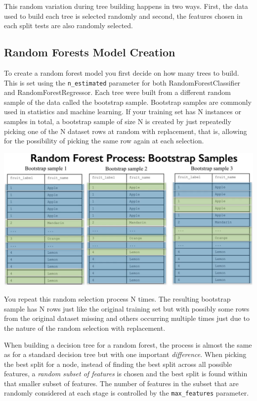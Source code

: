 This random variation during tree building happens in two ways. First, the data used to build each tree is selected randomly and second, the features chosen in each split tests are also randomly selected. 

\subsection{Random Forests Model Creation}

To create a random forest model you first decide on how many trees to build. This is set using the \texttt{n_estimated} parameter for both RandomForestClassifier and RandomForestRegressor. Each tree were built from a different random sample of the data called the bootstrap sample. Bootstrap samples are commonly used in statistics and machine learning. If your training set has N instances or samples in total, a bootstrap sample of size N is created by just repeatedly picking one of the N dataset rows at random with replacement, that is, allowing for the possibility of picking the same row again at each selection. 

\begin{center}
	\includegraphics[width=\linewidth]{img/Bootstrap-Samples.png} 
\end{center}

You repeat this random selection process N times. The resulting bootstrap sample has N rows just like the original training set but with possibly some rows from the original dataset missing and others occurring multiple times just due to the nature of the random selection with replacement. 

When building a decision tree for a random forest, the process is almost the same as for a standard decision tree but with one important \emph{difference}. When picking the best split for a node, instead of finding the best split across all possible features, a \emph{random subset of features} is chosen and the best split is found within that smaller subset of features. The number of features in the subset that are randomly considered at each stage is controlled by the \texttt{max_features} parameter. 

